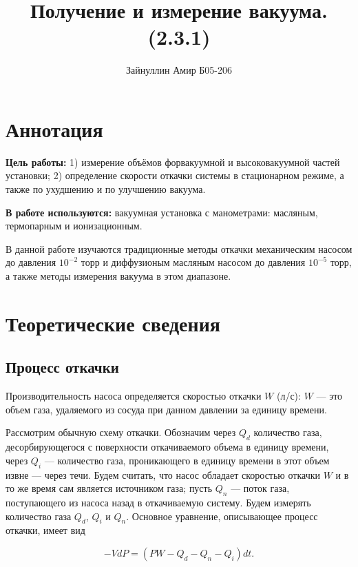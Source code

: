 \documentclass[a4paper,12pt]{article}
\begin{document}
	
	\title{\textbf{Получение и измерение вакуума. (2.3.1)}}
	\author{Зайнуллин Амир Б05-206}

	\maketitle

    \section{Аннотация}

	\textbf{Цель работы:} 1) измерение объёмов форвакуумной и высоковакуумной частей установки; 2) определение скорости откачки системы в стационарном режиме, а также по ухудшению и по улучшению вакуума.

    \textbf{В работе используются:} вакуумная установка с манометрами: масляным, термопарным и ионизационным.
	
    В данной работе изучаются традиционные методы откачки механическим насосом до давления $10^{-2}$ торр и диффузионым масляным насосом до давления $10^{-5}$ торр, а также методы измерения вакуума в этом диапазоне.



    \section{Теоретические сведения}

    \subsection*{Процесс откачки}
	Производительность насоса определяется скоростью откачки $W$ (л/с): $W$ — это объем газа, удаляемого из сосуда при данном давлении за единицу времени.

    Рассмотрим обычную схему откачки. Обозначим через $Q_d$ количество газа, десорбирующегося с поверхности откачиваемого объема в единицу времени, через $Q_i$ — количество газа, проникающего в единицу времени в этот объем извне — через течи. Будем считать, что насос обладает скоростью откачки $W$ и в то же время сам является источником газа; пусть $Q_n$ — поток газа, поступающего из насоса назад в откачиваемую систему. Будем измерять количество газа $Q_d$, $Q_i$ и $Q_n$. Основное уравнение, описывающее процесс откачки, имеет вид

    \begin{equation}
    	-VdP=(PW-Q_d-Q_n-Q_i)dt.
    \end{equation}
\end{document}
